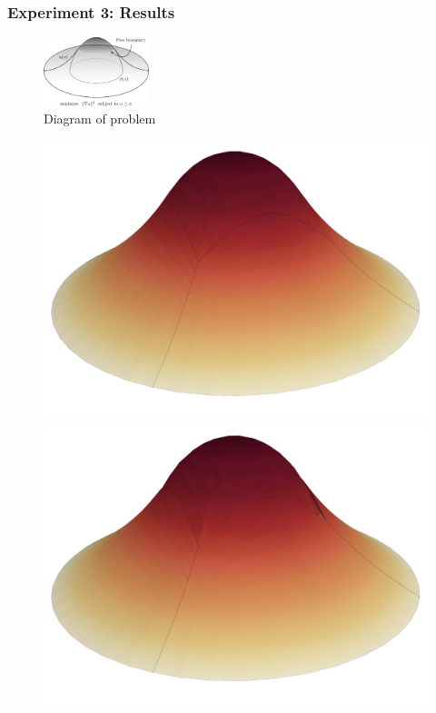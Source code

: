 \documentclass[aspectratio=169,xcolor=dvipsnames,11pt]{beamer}
\begin{document}
\begin{frame}\frametitle{Experiment 3: Results}
\begin{figure}
	\centering
	\begin{minipage}[c]{0.475\textwidth}
	\small
		\centering
		\includegraphics[clip=true, trim= 0 1cm 0 0, height=2cm]{Figures/obstacle_diagram.png}
		\\[0.4em]
		Diagram of problem
	\end{minipage}%
	\begin{minipage}[c]{0.475\textwidth}
	\small
		\centering
		\begin{minipage}[c]{0.85\textwidth}
		\centering
			\includegraphics[clip=true, trim = 0cm 2cm 0cm 1cm, width=0.5\linewidth]{Figures/ObstacleExperiment4_uh_alt}
			\includegraphics[clip=true, trim = 0cm 1cm 0cm 2cm, width=0.5\linewidth]{Figures/ObstacleExperiment4_uh_tilde_alt.png}
		\end{minipage}%
		\begin{minipage}[c]{0.075\textwidth}
			\centering

\end{minipage}
\end{minipage}
\end{figure}
\end{frame}
\end{document}
